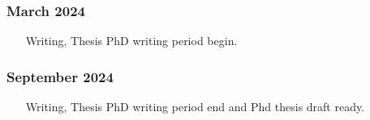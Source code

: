  \subsubsection{March 2024}
  \begin{enumerate}
    \item [Writing, Thesis] PhD writing period begin.
 \end{enumerate}

 \subsubsection{September 2024}
  \begin{enumerate}
    \item [Writing, Thesis] PhD writing period end and Phd thesis draft ready.
 \end{enumerate}












